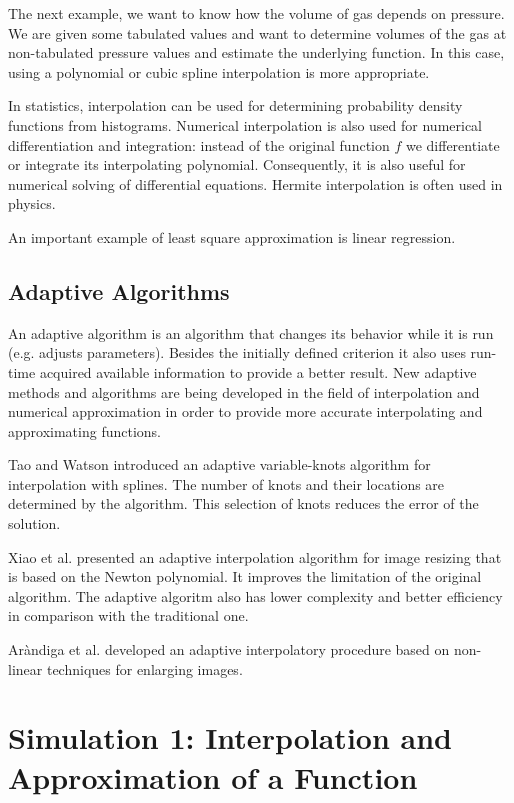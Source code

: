 \documentclass[a4paper,10pt]{article}
\begin{document}
The next example, we want to know how the volume of gas depends on pressure. We are given some tabulated values and want to determine volumes of the gas at non-tabulated pressure values and estimate the underlying function. In this case, using a polynomial or cubic spline interpolation is more appropriate. \cite{Woodford}

In statistics, interpolation can be used for determining probability density functions from histograms. 
Numerical interpolation is also used for numerical differentiation and integration: instead of the original function $f$ we differentiate or integrate its interpolating polynomial. Consequently, it is also useful for numerical solving of differential equations.
Hermite interpolation is often used in physics. \cite{Woodford}

An important example of least square approximation is linear regression. 

\subsection{Adaptive Algorithms}
An adaptive algorithm is an algorithm that changes its behavior while it is run (e.g. adjusts parameters). 
Besides the initially defined criterion it also uses run-time acquired available information to provide a better result. \cite{adalg}
New adaptive methods and algorithms are being developed in the field of interpolation and numerical approximation
in order to provide more accurate interpolating and approximating functions.

Tao and Watson introduced an adaptive variable-knots
algorithm for interpolation with splines. The number of knots and their locations
are determined by the algorithm. This selection of knots reduces the error of the solution. \cite{tao}

Xiao et al. presented an adaptive interpolation algorithm for image resizing that is based on the Newton polynomial.
It improves the limitation of the original algorithm. The adaptive algoritm also has lower complexity and better efficiency in comparison with the traditional one. \cite{xiao} 

Ar\`andiga et al. developed an adaptive interpolatory procedure based on non-linear techniques for enlarging images. \cite{arandiga} 

\section{Simulation 1: Interpolation and Approximation of a Function}
\end{document}
